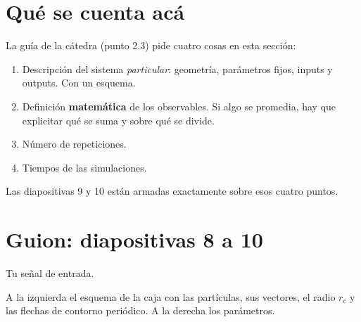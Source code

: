 \documentclass[11pt]{article}
\begin{document}

\tableofcontents
\clearpage

\section{Qué se cuenta acá}

La guía de la cátedra (punto 2.3) pide cuatro cosas en esta sección:

\begin{enumerate}
  \item Descripción del sistema \emph{particular}: geometría, parámetros fijos,
    inputs y outputs. Con un esquema.
  \item Definición \textbf{matemática} de los observables. Si algo se promedia,
    hay que explicitar qué se suma y sobre qué se divide.
  \item Número de repeticiones.
  \item Tiempos de las simulaciones.
\end{enumerate}

Las diapositivas 9 y 10 están armadas exactamente sobre esos cuatro puntos.


\section{Guion: diapositivas 8 a 10}


Tu señal de entrada.


A la izquierda el esquema de la caja con las partículas, sus vectores, el radio
$r_c$ y las flechas de contorno periódico. A la derecha los parámetros.
\end{document}

